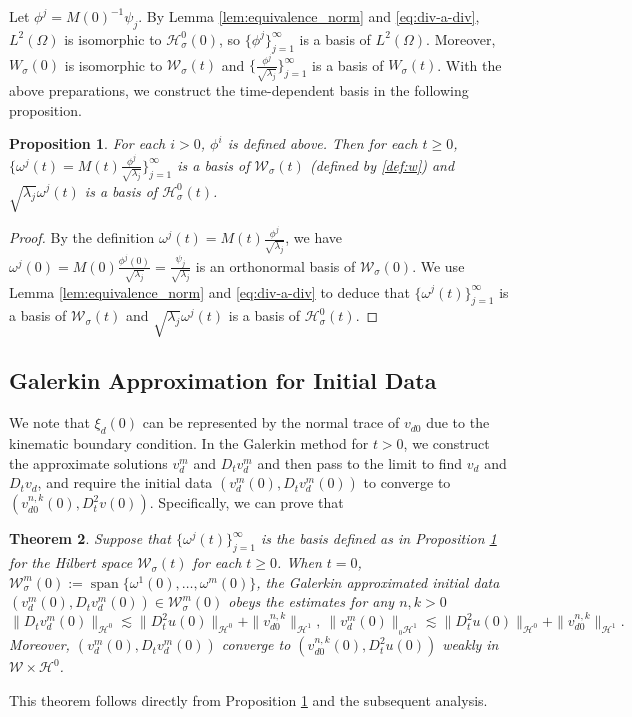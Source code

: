 \documentclass[letterpaper,reqno,10pt,twoside]{amsart}
\newtheorem{theorem}{Theorem}[section]
\newtheorem{proposition}[theorem]{Proposition}
\theoremstyle{definition}
\theoremstyle{remark}
\def\Om{\Omega}
\begin{document}
	Let $\phi^j=M(0)^{-1}\psi_j$. By Lemma \ref{lem:equivalence_norm} and \eqref{eq:div-a-div}, $L^2(\Om)$ is isomorphic to $\mathcal{H}_{\sigma}^0(0)$, so $\{\phi^j\}_{j=1}^\infty$ is a basis of $L^2(\Om)$. Moreover, ${W}_{\sigma}(0)$ is isomorphic to $\mathcal{W}_{\sigma}(t)$ and $\{\frac{\phi^j}{\sqrt{\lambda_j}}\}_{j=1}^\infty$ is a basis of ${W}_{\sigma}(t)$. With the above preparations, we construct the time-dependent basis in the following proposition.
	\begin{proposition}\label{prop:basis_galerkin}
		For each $i>0$, $\phi^{i}$ is defined above. Then for each $t\ge0$, $\{\omega^j(t)=M(t)\frac{\phi^j}{\sqrt{\lambda_j}}\}_{j=1}^\infty$ is a basis of $\mathcal{W}_{\sigma}(t)$ (defined by \eqref{def:w}) and $\sqrt{\lambda_j}\omega^j(t)$ is a basis of $\mathcal{H}_{\sigma}^0(t)$.
	\end{proposition}
	\begin{proof}
		By the definition $\omega^j(t)=M(t)\frac{\phi^j}{\sqrt{\lambda_j}}$, we have $\omega^j(0)=M(0)\frac{\phi^j(0)}{\sqrt{\lambda_j}}=\frac{\psi_j}{\sqrt{\lambda_j}}$ is an orthonormal basis of $\mathcal{W}_{\sigma}(0)$. We use Lemma \ref{lem:equivalence_norm} and \eqref{eq:div-a-div} to deduce that
		$\{\omega^j(t)\}_{j=1}^\infty$ is a basis of $\mathcal{W}_{\sigma}(t)$ and $\sqrt{\lambda_j}\omega^j(t)$ is a basis of $\mathcal{H}_{\sigma}^0(t)$.
	\end{proof}
	
	\subsection{Galerkin Approximation for Initial Data}\label{sec:app_initial}
	
	We note that $\xi_{d}(0)$ can be represented by the normal trace of $v_{d0}$ due to the kinematic boundary condition. In the Galerkin method for $t>0$, we construct the approximate solutions $v_{d}^m$ and $D_tv_{d}^m$ and then pass to the limit to find $v_{d}$ and $D_tv_{d}$, and require the initial data $(v_{d}^m(0), D_tv_{d}^m(0))$ to converge to $(v_{d0}^{n,k}(0), D_t^{2}v(0))$. Specifically, we can prove that
	\begin{theorem}\label{thm:initial_convergence}
		Suppose that $\{\omega^j(t)\}_{j=1}^\infty$ is the basis defined as in Proposition \ref{prop:basis_galerkin} for the Hilbert space $\mathcal{W}_{\sigma}(t)$ for each $t\ge0$. When $t=0$, $\mathcal{W}_{\sigma}^m(0):=\operatorname{span} \{\omega^1(0), \ldots, \omega^m(0)\}$, the Galerkin approximated initial data $(v_{d}^{m}(0), D_tv_{d}^m(0))\in \mathcal{W}_{\sigma}^m(0)$ obeys the estimates for any $n,k>0$
		\[
		\|D_{t}v_{d}^m(0)\|_{\mathcal{H}^0}  \lesssim \|D_{t}^{2}u(0)\|_{\mathcal{H}^0}+\|v_{d0}^{n,k}\|_{\mathcal{H}^1},
		\
		\|v_{d}^m(0)\|_{{}_{0}\mathcal{H}^1}  \lesssim \|D_{t}^{2}u(0)\|_{\mathcal{H}^0}+\|v_{d0}^{n,k}\|_{\mathcal{H}^1}.
		\]
		Moreover, $(v_{d}^m(0), D_tv_{d}^m(0))$ converge to $(v_{d0}^{n,k}(0), D_t^{2}u(0))$ weakly in $\mathcal{W}\times\mathcal{H}^0$.
	\end{theorem}
	This theorem follows directly from Proposition \ref{prop:basis_galerkin} and the subsequent analysis.
	
\end{document}
